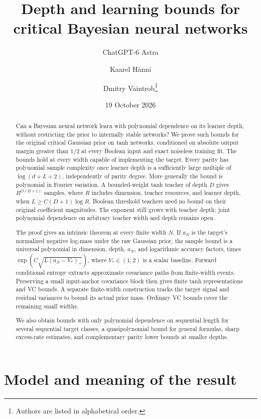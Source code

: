 \documentclass[11pt]{article}
\title{Depth and learning bounds for critical Bayesian neural networks}
\author{ChatGPT-6 Astra \and Kaarel H\"anni \and Dmitry Vaintrob\thanks{Authors are listed in alphabetical order.}}
\date{19 October 2026}
\begin{document}
\maketitle
\begin{abstract}
Can a Bayesian neural network learn with polynomial dependence on its
learner depth, without restricting the prior to internally stable networks?
We prove such bounds for the original critical Gaussian prior on tanh
networks, conditioned on absolute output margin greater than $1/2$ at
every Boolean input and exact noiseless
training fit. The bounds hold at every width capable of implementing the
target. Every parity has polynomial sample complexity once learner depth
is a sufficiently large multiple of $\log(d+L+2)$, independently of parity
degree. More generally the bound is polynomial in Fourier variation.
A bounded-weight tanh teacher of depth $D$ gives $R^{O(D+1)}$ samples,
where $R$ includes dimension, teacher resources, and learner depth, when
$L\ge C(D+1)\log R$. Boolean threshold teachers need no bound on their
original coefficient magnitudes. The exponent still grows with teacher
depth: joint polynomial dependence on arbitrary teacher width and depth
remains open.

The proof gives an intrinsic theorem at every finite width $N$. If
$a_N$ is the target's normalized negative log-mass under the raw Gaussian
prior, the sample bound
is a universal polynomial in dimension, depth, $a_N$, and logarithmic
accuracy factors, times $\exp(C\sqrt{L(a_N-V_*)_+})$, where
$V_*\in(1,2)$ is a scalar baseline. Forward conditional entropy extracts
approximate covariance paths from finite-width events. Preserving a small
input-anchor covariance block then gives finite tanh representations and
VC bounds. A separate finite-width construction tracks the target signal
and residual variances to bound its actual prior mass. Ordinary VC bounds
cover the remaining small widths.

We also obtain bounds with only polynomial dependence on sequential length
for several sequential target classes, a quasipolynomial bound for general formulas, sharp excess-rate
estimates, and complementary parity lower bounds at smaller depths.
\end{abstract}

\section{Model and meaning of the result}
\end{document}
